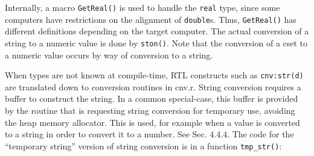 Internally, a macro \texttt{GetReal()} is used to handle the \texttt{real}
type, since some computers have restrictions on the alignment of
\texttt{double}s. Thus, \texttt{GetReal()} has different definitions depending
on the target computer. The actual conversion of a string to a numeric
value is done by \texttt{ston()}. Note that the conversion of a cset
to a numeric value occurs by way of conversion to a string.

When types are not known at compile-time, RTL constructs such as
\texttt{cnv:str(d)} are translated down to conversion routines in
cnv.r. String conversion requires a buffer to construct the string. In
a common special-case, this buffer is provided by the routine that is
requesting string conversion for temporary use, avoiding the heap
memory allocator.  This is used, for example when a value is converted
to a string in order to convert it to a number. See Sec. 4.4.4. The
code for the ``temporary string'' version of string conversion is in a
function \texttt{tmp\_str()}:


